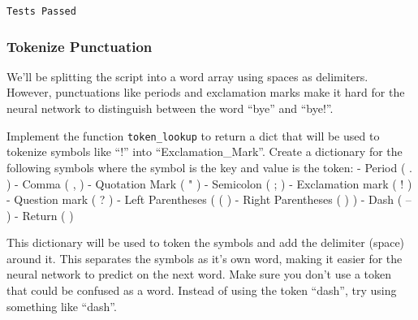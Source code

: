 \documentclass[11pt]{article}
\begin{document}
    \begin{Verbatim}[commandchars=\\\{\}]
Tests Passed

    \end{Verbatim}

    \hypertarget{tokenize-punctuation}{%
\subsubsection{Tokenize Punctuation}\label{tokenize-punctuation}}

We'll be splitting the script into a word array using spaces as
delimiters. However, punctuations like periods and exclamation marks
make it hard for the neural network to distinguish between the word
``bye'' and ``bye!''.

Implement the function \texttt{token\_lookup} to return a dict that will
be used to tokenize symbols like ``!'' into
``\textbar{}\textbar{}Exclamation\_Mark\textbar{}\textbar{}''. Create a
dictionary for the following symbols where the symbol is the key and
value is the token: - Period ( . ) - Comma ( , ) - Quotation Mark ( " )
- Semicolon ( ; ) - Exclamation mark ( ! ) - Question mark ( ? ) - Left
Parentheses ( ( ) - Right Parentheses ( ) ) - Dash ( -- ) - Return (
\n )

This dictionary will be used to token the symbols and add the delimiter
(space) around it. This separates the symbols as it's own word, making
it easier for the neural network to predict on the next word. Make sure
you don't use a token that could be confused as a word. Instead of using
the token ``dash'', try using something like
``\textbar{}\textbar{}dash\textbar{}\textbar{}''.
\end{document}
